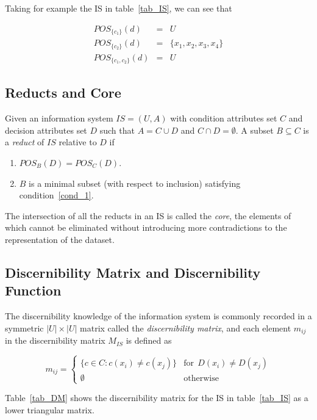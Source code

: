 \documentclass[authoryear,11pt]{elsarticle}
\begin{document}
  Taking for example the IS in table~\ref{tab_IS}, we can see that
  
  $$\begin{array}{lcc}
  POS_{\lbrace c_1 \rbrace}(d)&=&U\\
  POS_{\lbrace c_2 \rbrace}(d)&=& \lbrace x_1,x_2,x_3,x_4 \rbrace\\
  POS_{\lbrace c_1, c_2 \rbrace}(d)&=&U
  \end{array}$$
 
\subsection{Reducts and Core}
  Given an information system $IS=(U,A)$ with condition attributes set $C$ and decision attributes set
  $D$ such that $A=C \cup D$ and $C \cap D =\emptyset$. A subset $B \subseteq C$ is a \textit{reduct} 
  of $IS$ relative to $D$ if
  \begin{enumerate}
  	\item $POS_B(D)=POS_C(D)$. \label{cond_1}
  	\item $B$ is a minimal subset (with respect to inclusion) satisfying condition~\ref{cond_1}.
  \end{enumerate}
  
  The intersection of all the reducts in an IS is called the \textit{core}, the elements of which cannot be
  eliminated without introducing more contradictions to the representation of the dataset.
  
\subsection{Discernibility Matrix and Discernibility Function}
  The discernibility knowledge of the information system is commonly recorded in a symmetric $|U| \times |U|$
  matrix called the \textit{discernibility matrix}, and each element $m_{ij}$ in the discernibility matrix 
  $M_{IS}$ is defined as 
  
  \begin{equation}
  	m_{ij}=\left\lbrace\begin{array}{cl}
  			\lbrace c \in C: c(x_i) \neq c(x_j) \rbrace & \mathrm{for~~}D(x_i) \neq D(x_j)\\
  			\emptyset 								   & \mathrm{otherwise} 
  	\end{array}\right.
  \end{equation}
  
  Table~\ref{tab_DM} shows the discernibility matrix for the IS in table~\ref{tab_IS} as a lower triangular 
  matrix.
  
\end{document}
